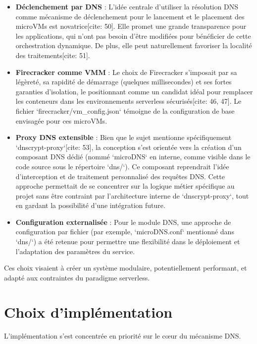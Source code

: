 \documentclass[12pt]{article}
\begin{document}
\begin{itemize}
    \item \textbf{Déclenchement par DNS} : L'idée centrale d'utiliser la résolution DNS comme mécanisme de déclenchement pour le lancement et le placement des microVMs est novatrice[cite: 50]. Elle promet une grande transparence pour les applications, qui n'ont pas besoin d'être modifiées pour bénéficier de cette orchestration dynamique. De plus, elle peut naturellement favoriser la localité des traitements[cite: 51].
    \item \textbf{Firecracker comme VMM} : Le choix de Firecracker s'imposait par sa légèreté, sa rapidité de démarrage (quelques millisecondes) et ses fortes garanties d'isolation, le positionnant comme un candidat idéal pour remplacer les conteneurs dans les environnements serverless sécurisés[cite: 46, 47]. Le fichier `firecracker/vm_config.json` témoigne de la configuration de base envisagée pour ces microVMs.
    \item \textbf{Proxy DNS extensible} : Bien que le sujet mentionne spécifiquement `dnscrypt-proxy`[cite: 53], la conception s'est orientée vers la création d'un composant DNS dédié (nommé `microDNS` en interne, comme visible dans le code source sous le répertoire `dns/`). Ce composant reprendrait l'idée d'interception et de traitement personnalisé des requêtes DNS. Cette approche permettait de se concentrer sur la logique métier spécifique au projet sans être contraint par l'architecture interne de `dnscrypt-proxy`, tout en gardant la possibilité d'une intégration future.
    \item \textbf{Configuration externalisée} : Pour le module DNS, une approche de configuration par fichier (par exemple, `microDNS.conf` mentionné dans `dns/`) a été retenue pour permettre une flexibilité dans le déploiement et l'adaptation des paramètres du service.
\end{itemize}

Ces choix visaient à créer un système modulaire, potentiellement performant, et adapté aux contraintes du paradigme serverless.

\section{Choix d'implémentation}
L'implémentation s'est concentrée en priorité sur le cœur du mécanisme DNS.
\end{document}
